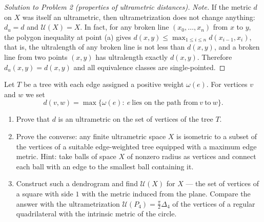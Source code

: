 \documentclass[a4paper,12pt]{report}
\begin{document}
\begin{proof}[Solution to Problem \textup{2} \textup{(}properties of ultrametric distances\textup{)}]
\textit{Note.} If the metric $d$ on $X$ was itself an ultrametric, then ultrametrization does not change anything\textup{:} $d_u=d$ and $\mathcal U(X)=X$. In fact, for any broken line $(x_0,\dots,x_n)$ from $x$ to $y$, the polygon inequality at point \textup{(a)} gives $d(x,y)\le\max_{1\le i\le n}d(x_{i-1},x_i)$, that is, the ultralength of any broken line is not less than $d(x,y)$, and a broken line from two points $(x,y)$ has ultralength exactly $d(x,y)$. Therefore $d_u(x,y)=d(x,y)$ and all equivalence classes are single-pointed.

\end{proof}
\begin{task}
Let $T$ be a tree with each edge assigned a positive weight $\omega(e)$. For vertices $v$ and $w$ we set
\[
d(v,w)=\max\bigl\{\omega(e):\ e\ \text{lies on the path from}\ v\ \text{to}\ w\bigr\}.
\]
\begin{enumerate}[label=\textup{(\alph*)}]
\item Prove that $d$ is an ultrametric on the set of vertices of the tree $T$.
\item Prove the converse\textup{:} any finite ultrametric space $X$ is isometric to a subset of the vertices of a suitable edge-weighted tree equipped with a maximum edge metric. Hint\textup{:} take balls of space $X$ of nonzero radius as vertices and connect each ball with an edge to the smallest ball containing it.
\item Construct such a dendrogram and find $\mathcal U(X)$ for $X$ --- the set of vertices of a square with side $1$ with the metric induced from the plane. Compare the answer with the ultrametrization $\mathcal U(P_4) = \frac{\pi}{2}\Delta_4$ of the vertices of a regular quadrilateral with the intrinsic metric of the circle.
\end{enumerate}
\end{task}
\end{document}

